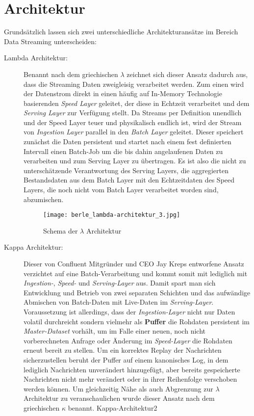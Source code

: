 \section{Architektur}
\label{sec:arch}
Grundsätzlich lassen sich zwei unterschiedliche Architekturansätze im Bereich Data Streaming unterscheiden:

\begin{description}
\item [Lambda Architektur:] Benannt nach dem griechischen $\lambda$ zeichnet sich dieser Ansatz dadurch aus, dass die Streaming Daten zweigleisig verarbeitet werden. Zum einen wird der Datenstrom direkt in einen häufig auf In-Memory Technologie basierenden \textit{Speed Layer} geleitet, der diese in Echtzeit verarbeitet und dem \textit{Serving Layer} zur Verfügung stellt. Da Streams per Definition unendlich und der Speed Layer teuer und physikalisch endlich ist, wird der Stream von \textit{Ingestion Layer} parallel in den \textit{Batch Layer} geleitet. Dieser speichert zunächst die Daten persistent und startet nach einem fest definierten Intervall einen Batch-Job um die bis dahin angelaufenen Daten zu verarbeiten und zum Serving Layer zu übertragen. Es ist also die nicht zu unterschätzende  Verantwortung des Serving Layers, die aggregierten Bestandsdaten aus dem Batch Layer mit den Echtzeitdaten des Speed Layers, die noch nicht vom Batch Layer verarbeitet worden sind, abzumischen.\autocite{lambda-architecture} \autocite{jaxkappa} 

\begin{figure}[h]
	\centering
	\texttt{[image: berle\_lambda-architektur\_3.jpg]}
	\caption[Schema der $\lambda$ Architektur]{Schema der $\lambda$ Architektur\autocite{jaxkappa}}
	\label{fig:KafkaArchitecture}
\end{figure}


\item [Kappa Architektur:] Dieser von Confluent Mitgründer und CEO Jay Kreps entworfene Ansatz verzichtet auf eine Batch-Verarbeitung und kommt somit mit lediglich mit \textit{Ingestion-}, \textit{Speed-} und \textit{Serving-Layer} aus. Damit spart man sich Entwicklung und Betrieb von zwei separaten Schichten und das aufwändige Abmischen von Batch-Daten mit Live-Daten im \textit{Serving-Layer}. Voraussetzung ist allerdings, dass der \textit{Ingestion-Layer} nicht nur Daten volatil durchreicht sondern vielmehr als \textbf{Puffer} die Rohdaten persistent im \textit{Master-Dataset} vorhält, um im Falle einer neuen, noch nicht vorberechneten Anfrage oder Änderung im \textit{Speed-Layer} die Rohdaten erneut bereit zu stellen. Um ein korrektes Replay der Nachrichten sicherzustellen beruht der Puffer auf einem kanonisches Log, in dem lediglich Nachrichten unverändert hinzugefügt, aber bereits gespeicherte Nachrichten nicht mehr verändert oder in ihrer Reihenfolge verschoben werden können. Um gleichzeitig Nähe als auch Abgrenzung zur $\lambda$ Architektur zu veranschaulichen wurde dieser Ansatz nach dem griechischen $\kappa$ benannt.\autocite{Kappa-Architektur} {Kappa-Architektur2}


\end{description}
